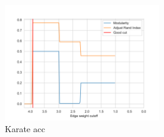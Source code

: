 \begin{figure}
    \centering
    \includegraphics[width=0.6\textwidth]{../KarateClubResults/Surgery Accuracy.png}
    \caption{Karate acc}
    \label{fig:Karate_Accuracy}
\end{figure}

